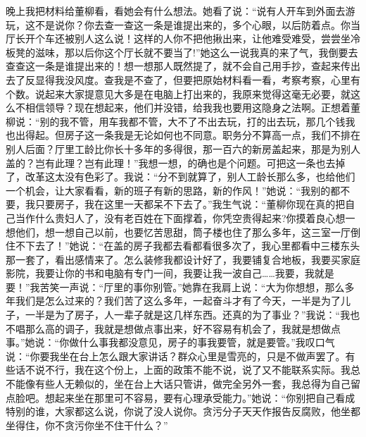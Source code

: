 \documentclass[12pt,oneside]{book}
\begin{document}
晚上我把材料给董柳看，看她会有什么想法。她看了说：``说有人开车到外面去游玩，这不是说你？你去查一查这一条是谁提出来的，多个心眼，以后防着点。你当厅长开个车还被别人这么说！这样的人你不把他揪出来，让他难受难受，尝尝坐冷板凳的滋味，那以后你这个厅长就不要当了!''她这么一说我真的来了气，我倒要去查查这一条是谁提出来的！想一想那人既然提了，就不会自己用手抄，查起来传出去了反显得我没风度。查我是不查了，但要把原始材料看一看，考察考察，心里有个数。说起来大家提意见大多是在电脑上打出来的，我原来觉得这毫无必要，就这么不相信领导？现在想起来，他们并没错，给我我也要用这隐身之法啊。正想着董柳说：``别的我不管，用车我都不管，大不了不出去玩，打的出去玩，那几个钱我也出得起。但房子这一条我是无论如何也不同意。职务分不算高一点，我们不排在别人后面？厅里工龄比你长十多年的多得很，那一百六的新房盖起来，那是为别人盖的？岂有此理？岂有此理！''我想一想，的确也是个问题。可把这一条也去掉了，改革这太没有色彩了。我说：``分不到就算了，别人工龄长那么多，也给他们一个机会，让大家看看，新的班子有新的思路，新的作风！''她说：``我别的都不要，我只要房子，我在这里一天都呆不下去了。''我生气说：``董柳你现在真的把自己当作什么贵妇人了，没有老百姓在下面撑着，你凭空贵得起来?你摸着良心想一想他们，想一想自己以前，也要忆苦思甜，筒子楼也住了那么多年，这三室一厅倒住不下去了！''她说：``在盖的房子我都去看都看很多次了，我心里都看中三楼东头那一套了，看出感情来了。怎么装修我都设计好了，我要铺复合地板，我要买家庭影院，我要让你的书和电脑有专门一间，我要让我一波自己\ldots\ldots 我要，我就是要！''我苦笑一声说：``厅里的事你别管。''她靠在我肩上说：``大为你想想，那么多年我们是怎么过来的？我们苦了这么多年，一起奋斗才有了今天，一半是为了儿子，一半是为了房子，人一辈子就是这几样东西。还真的为了事业？''我说：``我也不唱那么高的调子，我就是想做点事出来，好不容易有机会了，我就是想做点事。''她说：``你做什么事我都没意见，房子的事我要管，就是要管。''我叹口气说：``你要我坐在台上怎么跟大家讲话？群众心里是雪亮的，只是不做声罢了。有些话不说不行，我在这个份上，上面的政策不能不说，说了又不能联系实际。我总不能像有些人无赖似的，坐在台上大话只管讲，做完全另外一套，我总得为自己留点脸吧。想起来坐在那里可不容易，要有心理承受能力。''她说：``你别把自己看成特别的谁，大家都这么说，你说了没人说你。贪污分子天天作报告反腐败，他坐都坐得住，你不贪污你坐不住干什么？''
\end{document}
